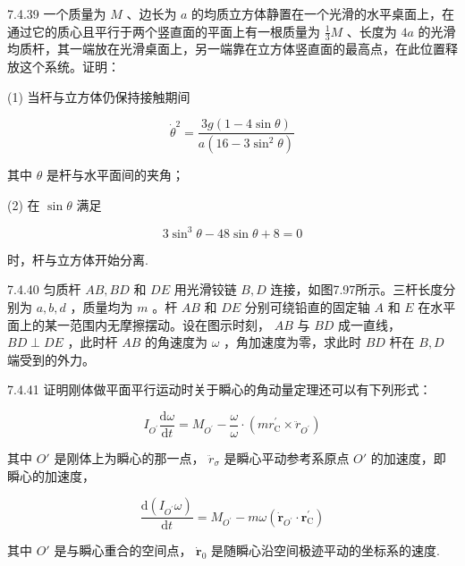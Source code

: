 \begin{problem}{7.4.39}
一个质量为 $M$ 、边长为 $a$ 的均质立方体静置在一个光滑的水平桌面上，在通过它的质心且平行于两个竖直面的平面上有一根质量为 $\frac{1}{3} M$ 、长度为 $4a$ 的光滑均质杆，其一端放在光滑桌面上，另一端靠在立方体竖直面的最高点，在此位置释放这个系统。证明：

(1) 当杆与立方体仍保持接触期间

\[
\dot {\theta} ^ {2} = \frac {3 g (1 - 4 \sin \theta)}{a (1 6 - 3 \sin^ {2} \theta)}
\]

其中 $\theta$ 是杆与水平面间的夹角；

(2) 在 $\sin \theta$ 满足

\[
3 \sin^ {3} \theta - 4 8 \sin \theta + 8 = 0
\]

时，杆与立方体开始分离.
\end{problem}
\clearpage


\begin{problem}{7.4.40}
匀质杆 $AB, BD$ 和 $DE$ 用光滑铰链 $B, D$ 连接，如图7.97所示。三杆长度分别为 $a, b, d$ ，质量均为 $m$ 。杆 $AB$ 和 $DE$ 分别可绕铅直的固定轴 $A$ 和 $E$ 在水平面上的某一范围内无摩擦摆动。设在图示时刻， $AB$ 与 $BD$ 成一直线， $BD \perp DE$ ，此时杆 $AB$ 的角速度为 $\omega$ ，角加速度为零，求此时 $BD$ 杆在 $B, D$ 端受到的外力。
\begin{center}

\end{center}
\end{problem}
\clearpage


\begin{problem}{7.4.41}
证明刚体做平面平行运动时关于瞬心的角动量定理还可以有下列形式：

\[
I _ {O ^ {\prime}} \frac {\mathrm{d} \omega}{\mathrm{d} t} = M _ {O ^ {\prime}} - \frac {\omega}{\omega} \cdot (m r _ {\mathrm{C}} ^ {\prime} \times \ddot {r} _ {O ^ {\prime}})
\]

其中 $O'$ 是刚体上为瞬心的那一点， $\ddot{r}_{\sigma}$ 是瞬心平动参考系原点 $O'$ 的加速度，即瞬心的加速度，

\[
\frac {\mathrm{d} (I _ {O ^ {\prime}} \omega)}{\mathrm{d} t} = M _ {O ^ {\prime}} - m \omega (\dot {\boldsymbol {r}} _ {O ^ {\prime}} \cdot \boldsymbol {r} _ {\mathrm{C}} ^ {\prime})
\]

其中 $O'$ 是与瞬心重合的空间点， $\dot{\bm{r}}_0$ 是随瞬心沿空间极迹平动的坐标系的速度.
\begin{center}

\end{center}
\end{problem}
\clearpage


